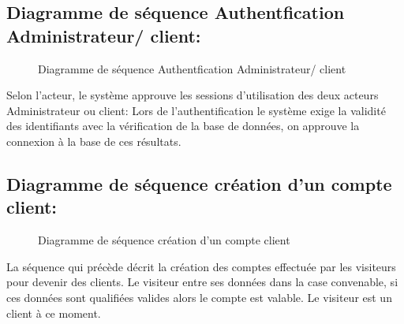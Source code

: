 \documentclass[a4paper]{report}
\begin{document}
\begin{doublespace}
\begin{doublespace}
\begin{doublespace}
\begin{doublespace}
                \subsection{Diagramme de séquence Authentfication
                    Administrateur/ client:}
                \begin{figure}[H]
                    \begin{center}
                        \caption{Diagramme de séquence Authentfication
                            Administrateur/ client}
                    \end{center}
                \end{figure}
                Selon l'acteur, le système approuve les sessions
                d'utilisation des deux acteurs Administrateur ou client: Lors de
                l'authentification le système exige la validité des identifiants avec la
                vérification de la base de données, on approuve la connexion à la base de ces
                résultats.
                \subsection{Diagramme de séquence création d'un compte
                    client:}
                \begin{figure}[H]
                    \begin{center}
                        \caption{Diagramme de séquence création d'un compte
                            client}
                    \end{center}
                \end{figure}
                La séquence  qui précède décrit la création des comptes
                effectuée par les visiteurs pour devenir des clients. Le visiteur entre ses
                données dans la case convenable, si ces données sont qualifiées valides alors
                le compte est valable. Le visiteur est un client à ce moment.

\end{doublespace}
\end{doublespace}
\end{doublespace}
\end{doublespace}
\end{document}
